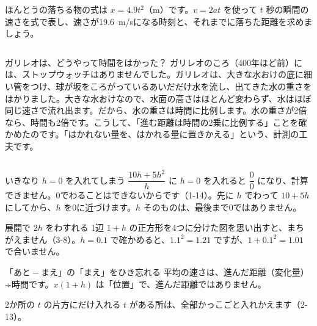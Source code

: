 \begin{jibun}
ほんとうの落ちる物の式は $x=4.9t^2$（m）です。$v=2at$ を使って $t$ 秒の瞬間の速さを式で表し、速さが\qty{19.6}{m/s}になる時刻と、それまでに落ちた距離を求めましょう。
\end{jibun}

\begin{column}{ガリレオは、どうやって時間をはかった？}
ガリレオのころ（400年ほど前）には、ストップウォッチはありませんでした。ガリレオは、大きな水おけの底に細い管をつけ、球が坂をころがっているあいだだけ水を流し、出てきた水の重さをはかりました。大きな水おけなので、水面の高さはほとんど変わらず、水はほぼ同じ速さで流れ出ます。だから、水の重さは時間に比例します。水の重さが2倍なら、時間も2倍です。こうして、「進む距離は時間の2乗に比例する」ことを確かめたのです。「はかれない量を、はかれる量に置きかえる」という、計測の工夫です。
\end{column}

\clearpage

\begin{tsumazuki}{いきなり $h=0$ を入れてしまう}
\vspace{7pt}%
$\dfrac{10h+5h^2}{h}$ に $h=0$ を入れると $\dfrac{0}{0}$ になり、計算できません。0でわることはできないからです（1-14）。先に $h$ でわって $10+5h$ にしてから、$h$ を0に近づけます。$h$ そのものは、最後まで0ではありません。
\end{tsumazuki}

\begin{tsumazuki}{展開で $2h$ をわすれる}
1辺 $1+h$ の正方形を4つに分けた図を思い出すと、まちがえません（3-8）。$h=0.1$ で確かめると、$1.1^2=1.21$ ですが、$1+0.1^2=1.01$ で合いません。
\end{tsumazuki}

\begin{tsumazuki}{「あと${}-{}$まえ」の「まえ」をひき忘れる}
平均の速さは、進んだ距離（変化量）÷時間です。$x(1+h)$ は「位置」で、進んだ距離ではありません。
\end{tsumazuki}

\begin{tsumazuki}{2か所の $t$ の片方にだけ入れる}
$t$ がある所は、全部かっこごと入れかえます（2-13）。
\end{tsumazuki}

